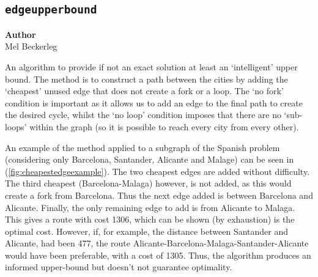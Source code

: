 \subsection{\texttt{edgeupperbound}}
\label{subsec:degeupperbound}

\begin{flushright}
\textbf{Author} \\
Mel Beckerleg
\end{flushright}

An algorithm to provide if not an exact solution at least an `intelligent' upper bound. The method is to construct a path between the cities by adding the `cheapest' unused edge that does not create a fork or a loop. The `no fork' condition is important as it allows us to add an edge to the final path to create the desired cycle, whilst the `no loop' condition imposes that there are no `sub-loops' within the graph (so it is possible to reach every city from every other). 

An example of the method applied to a subgraph of the Spanish problem (considering only Barcelona, Santander, Alicante and Malage) can be seen in (\ref{fig:cheapestedgeexample}). The two cheapest edges are added without difficulty. The third cheapest (Barcelona-Malaga) however, is not added, as this would create a fork from Barcelona. Thus the next edge added is between Barcelona and Alicante. Finally, the only remaining edge to add is from Alicante to Malaga. This gives a route with cost 1306, which can be shown (by exhaustion) is the optimal cost. However, if, for example, the distance between Santander and Alicante, had been 477, the route Alicante-Barcelona-Malaga-Santander-Alicante would have been preferable, with a cost of 1305. Thus, the algorithm produces an informed upper-bound but doesn't not guarantee optimality. 


